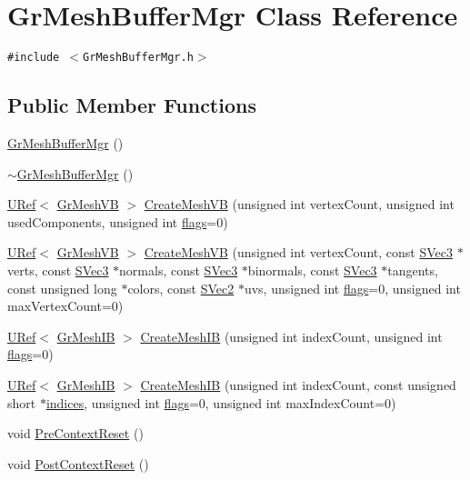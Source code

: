 \hypertarget{class_gr_mesh_buffer_mgr}{
\section{GrMeshBufferMgr Class Reference}
\label{class_gr_mesh_buffer_mgr}
}
{\tt \#include $<$GrMeshBufferMgr.h$>$}

\subsection*{Public Member Functions}
\begin{CompactItemize}
\item 
\hyperlink{class_gr_mesh_buffer_mgr_52ef406fa29b32c20970048906c09786}{GrMeshBufferMgr} ()
\item 
\hyperlink{class_gr_mesh_buffer_mgr_587da5dd15890928e41bbda7bf100813}{$\sim$GrMeshBufferMgr} ()
\item 
\hyperlink{class_u_ref}{URef}$<$ \hyperlink{class_gr_mesh_v_b}{GrMeshVB} $>$ \hyperlink{class_gr_mesh_buffer_mgr_e2becc9588cfb3d8858a4c998bc3dbc6}{CreateMeshVB} (unsigned int vertexCount, unsigned int usedComponents, unsigned int \hyperlink{_u_t_message_8h_0a3c0b351ab09281b662a9ff4f900a53}{flags}=0)
\item 
\hyperlink{class_u_ref}{URef}$<$ \hyperlink{class_gr_mesh_v_b}{GrMeshVB} $>$ \hyperlink{class_gr_mesh_buffer_mgr_6cef06c50c3ebb42829bc659c295f3de}{CreateMeshVB} (unsigned int vertexCount, const \hyperlink{struct_s_vec3}{SVec3} $\ast$verts, const \hyperlink{struct_s_vec3}{SVec3} $\ast$normals, const \hyperlink{struct_s_vec3}{SVec3} $\ast$binormals, const \hyperlink{struct_s_vec3}{SVec3} $\ast$tangents, const unsigned long $\ast$colors, const \hyperlink{struct_s_vec2}{SVec2} $\ast$uvs, unsigned int \hyperlink{_u_t_message_8h_0a3c0b351ab09281b662a9ff4f900a53}{flags}=0, unsigned int maxVertexCount=0)
\item 
\hyperlink{class_u_ref}{URef}$<$ \hyperlink{class_gr_mesh_i_b}{GrMeshIB} $>$ \hyperlink{class_gr_mesh_buffer_mgr_91c2e8bf41d8e63797ace280348679eb}{CreateMeshIB} (unsigned int indexCount, unsigned int \hyperlink{_u_t_message_8h_0a3c0b351ab09281b662a9ff4f900a53}{flags}=0)
\item 
\hyperlink{class_u_ref}{URef}$<$ \hyperlink{class_gr_mesh_i_b}{GrMeshIB} $>$ \hyperlink{class_gr_mesh_buffer_mgr_d29ad1bec1ff9a8027f9a474274931f2}{CreateMeshIB} (unsigned int indexCount, const unsigned short $\ast$\hyperlink{glext__bak_8h_c4293d0f76770fe857be3431df25308d}{indices}, unsigned int \hyperlink{_u_t_message_8h_0a3c0b351ab09281b662a9ff4f900a53}{flags}=0, unsigned int maxIndexCount=0)
\item 
void \hyperlink{class_gr_mesh_buffer_mgr_497eace30ff7d4e24e43627ec3e8aab5}{PreContextReset} ()
\item 
void \hyperlink{class_gr_mesh_buffer_mgr_586bd053976b8b8a4836321bf4f68eef}{PostContextReset} ()
\end{CompactItemize}


